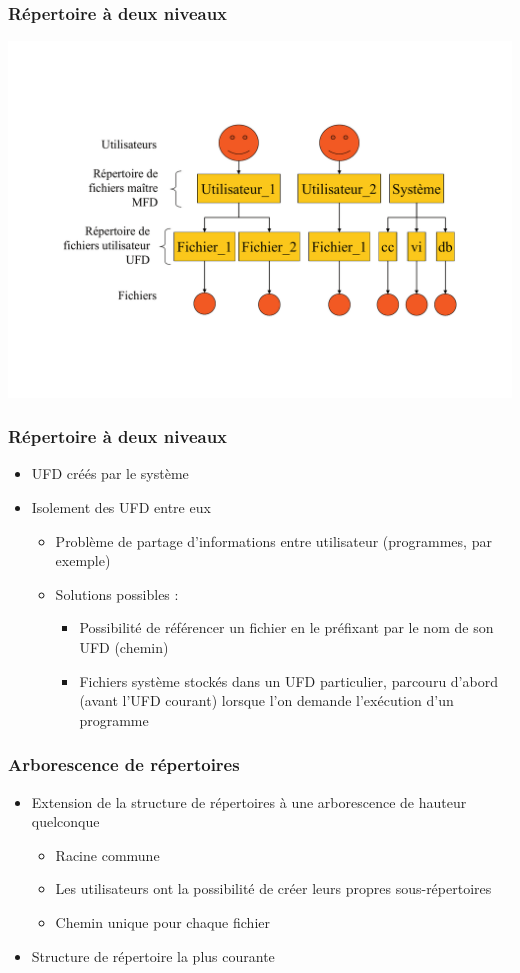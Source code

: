 \begin{frame}
\frametitle{Répertoire à deux niveaux}
\includegraphics[width=.9\textwidth]{../illustration/repertoire_2niveaux.pdf}
\end{frame}

\begin{frame}
\frametitle{Répertoire à deux niveaux}
\begin{itemize}
\item UFD créés par le système
\item Isolement des UFD entre eux
\begin{itemize}
\item Problème de partage d'informations entre utilisateur (programmes, par exemple)
\item Solutions possibles :
\begin{itemize}
\item Possibilité de référencer un fichier en le préfixant par le nom de son UFD (chemin)
\item Fichiers système stockés dans un UFD particulier, parcouru d'abord (avant l'UFD courant) lorsque l'on demande l'exécution d'un programme
\end{itemize}
\end{itemize}
\end{itemize}
\end{frame}

\begin{frame}
\frametitle{Arborescence de répertoires}
\begin{itemize}
\item Extension de la structure de répertoires à une arborescence de hauteur quelconque
\begin{itemize}
\item Racine commune
\item Les utilisateurs ont la possibilité de créer leurs propres sous-répertoires
\item Chemin unique pour chaque fichier
\end{itemize}
\item Structure de répertoire la plus courante
\end{itemize}
\end{frame}

